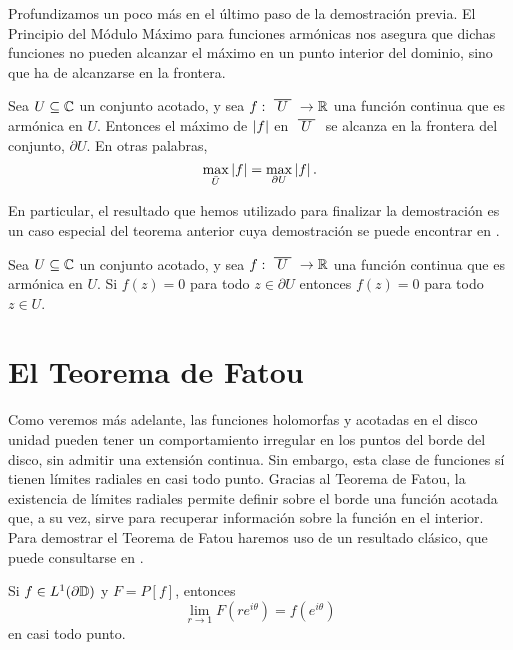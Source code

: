 Profundizamos un poco más en el último paso de la demostración previa. El Principio del Módulo Máximo para funciones armónicas nos asegura que dichas funciones no pueden alcanzar el máximo en un punto interior del dominio, sino que ha de alcanzarse en la frontera. \\

\begin{theorem}
    Sea $U \subseteq \mathbb{C}$ un conjunto acotado, y sea $f: \xbar{U} \to \real$ una función continua que es armónica en $U$. Entonces el máximo de $\left\lvert f\right\rvert$ en $\xbar{U}$ se alcanza en la frontera del conjunto, $\partial U$. En otras palabras,
    \begin{equation*}
        \max_{\bar{U}} \left\lvert f\right\rvert = \max_{\partial U}\left\lvert f\right\rvert.
    \end{equation*}
\end{theorem}

En particular, el resultado que hemos utilizado para finalizar la demostración es un caso especial del teorema anterior cuya demostración se puede encontrar en \citet[capítulo 10]{conway1}. \\

\begin{corollary}
    Sea $U \subseteq \mathbb{C}$ un conjunto acotado, y sea $f: \xbar{U} \to \real$ una función continua que es armónica en $U$. Si $f(z) = 0$ para todo $z \in \partial U$ entonces $f(z) = 0$ para todo $z \in U$.
\end{corollary}


\section{El Teorema de Fatou}

Como veremos más adelante, las funciones holomorfas y acotadas en el disco unidad pueden tener un comportamiento irregular en los puntos del borde del disco, sin admitir una extensión continua. Sin embargo, esta clase de funciones sí tienen límites radiales en casi todo punto. Gracias al Teorema de Fatou, la existencia de límites radiales permite definir sobre el borde una función acotada que, a su vez, sirve para recuperar información sobre la función en el interior. \\

Para demostrar el Teorema de Fatou haremos uso de un resultado clásico, que puede consultarse en \citet[capítulo 11]{rudin}. \\

\begin{theorem}
    \label{th:fatouaux1}
    Si $f \in L^1(\partial \mathbb{D})$ y $F = P[f]$, entonces
    \begin{equation*}
        \lim_{r \to 1} F(re^{i \theta}) = f(e^{i \theta})
    \end{equation*}
    en casi todo punto. \\
\end{theorem}

